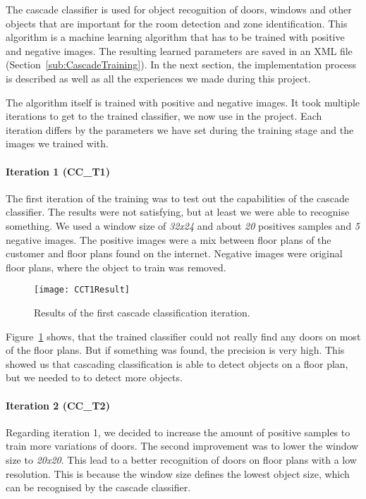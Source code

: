The cascade classifier is used for object recognition of doors, windows and other objects that are important for the room detection and zone identification. This algorithm is a machine learning algorithm that has to be trained with positive and negative images. The resulting learned parameters are saved in an XML file (Section~\ref{sub:CascadeTraining}). In the next section, the implementation process is described as well as all the experiences we made during this project.

The algorithm itself is trained with positive and negative images. It took multiple iterations to get to the trained classifier, we now use in the project. Each iteration differs by the parameters we have set during the training stage and the images we trained with.

\paragraph{Iteration 1 (CC\_T1)}
\label{sub:CCT1}
The first iteration of the training was to test out the capabilities of the cascade classifier. The results were not satisfying, but at least we were able to recognise something. We used a window size of \textit{32x24} and about \textit{20} positives samples and \textit{5} negative images. The positive images were a mix between floor plans of the customer and floor plans found on the internet. Negative images were original floor plans, where the object to train was removed.

\begin{figure}[H]
	\centering
	\texttt{[image: CCT1Result]}
	\caption{Results of the first cascade classification iteration.}
	\label{fig:CCT1Result}
\end{figure}

Figure~\ref{fig:CCT1Result} shows, that the trained classifier could not really find any doors on most of the floor plans. But if something was found, the precision is very high. This showed us that cascading classification is able to detect objects on a floor plan, but we needed to to detect more objects.

\paragraph{Iteration 2 (CC\_T2)}
\label{sub:CCT2}

Regarding iteration 1, we decided to increase the amount of positive samples to train more variations of doors. The second improvement was to lower the window size to \textit{20x20}. This lead to a better recognition of doors on floor plans with a low resolution. This is because the window size defines the lowest object size, which can be recognised by the cascade classifier.

